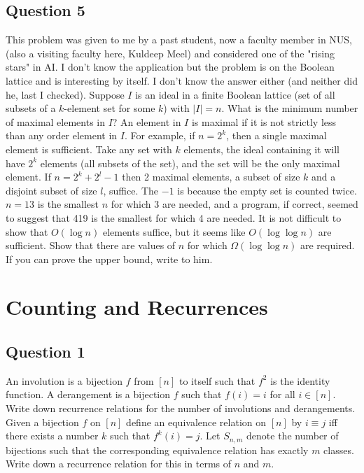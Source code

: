 \documentclass[12pt]{report}
\begin{document}
\section*{Question 5}
This problem was given to me by a past student, now a faculty member in NUS, (also a visiting faculty here, Kuldeep Meel) and considered one of the "rising stars" in AI. I don't know the application but the problem is on the Boolean lattice and is interesting by itself. I don't know the answer either (and neither did he, last I checked). Suppose $I$ is an ideal in a finite Boolean lattice (set of all subsets of a $k$-element set for some $k$) with $|I| = n$. What is the minimum number of maximal elements in $I$? An element in $I$ is maximal if it is not strictly less than any order element in $I$. For example, if $n = 2^{k}$, then a single maximal element is sufficient. Take any set with $k$ elements, the ideal containing it will have $2^{k}$ elements (all subsets of the set), and the set will be the only maximal element. If $n = 2^{k} + 2^{l} - 1$ then 2 maximal elements, a subset of size $k$ and a disjoint subset of size $l$, suffice. The $-1$ is because the empty set is counted twice. $n = 13$ is the smallest $n$ for which 3 are needed, and a program, if correct, seemed to suggest that 419 is the smallest for which 4 are needed. It is not difficult to show that $O(\log n)$ elements suffice, but it seems like $O(\log \log n)$ are sufficient. Show that there are values of $n$ for which $\Omega(\log \log n)$ are required. If you can prove the upper bound, write to him.
\chapter{Counting and Recurrences}
\section*{Question 1}
An involution is a bijection $f$ from $\left[n\right]$ to itself such that $f^2$ is the identity function. A derangement is a bijection $f$ such that $f(i) = i$ for all $i \in \left[n\right]$. Write down recurrence relations for the number of involutions and derangements. Given a bijection $f$ on $\left[n\right]$ define an equivalence relation on $\left[n\right]$ by $i \equiv j$ iff there exists a number $k$ such that $f^{k}(i) = j$. Let $S_{n, m}$ denote the number of bijections such that the corresponding equivalence relation has exactly $m$ classes. Write down a recurrence relation for this in terms of $n$ and $m$.
\end{document}
